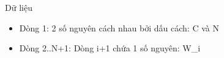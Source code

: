 Dữ liệu  
\begin{itemize}
	\item     Dòng 1: 2 số nguyên cách nhau bởi dấu cách: C và N   
	\item     Dòng 2..N+1: Dòng i+1 chứa 1 số nguyên: W\_i   
\end{itemize}